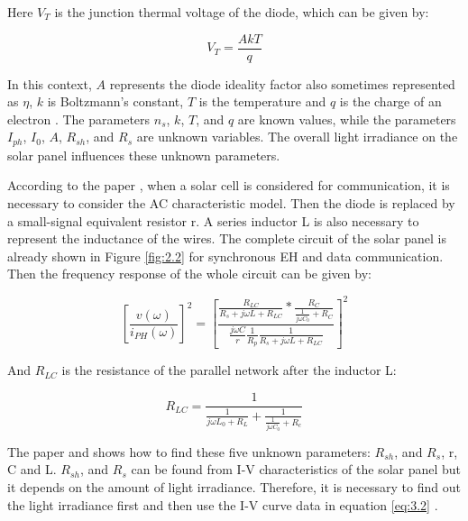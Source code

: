 Here \(V_T \) is the junction thermal voltage of the diode, which can be given by: 

\begin{equation}
\ V_{T} =\frac{AkT}{q} \
\label{eq:3.3}
\end{equation}

In this context, \( A \) represents the diode ideality factor also sometimes represented as \( \eta \), \( k \) is Boltzmann's constant, \( T \) is the temperature and \( q \) is the charge of an electron \cite{wang2015design} \cite{4374981}. The parameters \( n_s \), \( k \), \( T \), and \( q \) are known values, while the parameters \( I_{ph} \), \( I_{0} \), \( A \), \( R_{sh} \), and \( R_{s} \) are unknown variables. The overall light irradiance on the solar panel influences these unknown parameters.\cite{wang2015design}

According to the paper \cite{wang2015design}, when a solar cell is considered for communication, it is necessary to consider the AC characteristic model. Then the diode is replaced by a small-signal equivalent resistor r. A series inductor L is also necessary to represent the inductance of the wires. The complete circuit of the solar panel is already shown in Figure \ref{fig:2.2} for synchronous \ac{EH} and data
communication. Then the frequency response of the whole circuit can be given by:

\begin{equation}
\ \left[ \frac{v (\omega)}{i_{PH}(\omega)}\right]^2 = \left[ \frac{\frac{R_{LC}}{R_{s}+j\omega L+R_{LC}}*\frac{R_{C}}{\frac{1}{j\omega C_{0}}+R_{C}}}{\frac{j\omega C}{r}\frac{1}{R_{p}}\frac{1}{R_{s}+j\omega L+R_{LC}}}\right]^2 \
\label{eq:3.4}
\end{equation}

And \( R_{LC} \) is the resistance of the parallel network after the inductor L:

\begin{equation}
\ R_{LC} =  \frac{1}{\frac{1}{j \omega L_{0} + R_{L}} + \frac{1}{ \frac{1}{j \omega C_{0}} + R_{c}}} \
\label{eq:3.5}
\end{equation}

The paper \cite{wang2015design} and \cite{4374981} shows how to find these five unknown parameters:  \( R_{sh} \), and \( R_{s} \), r, C and L. \( R_{sh} \), and \( R_{s} \) can be found from I-V characteristics of the solar panel but it depends on the amount of light irradiance. Therefore, it is necessary to find out the light irradiance first and then use the I-V curve data in equation \ref{eq:3.2} \cite{wang2015design}\cite{fan2017circuit}. 

